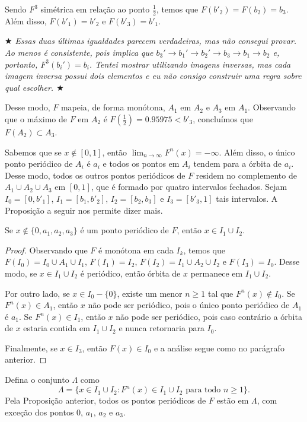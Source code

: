 Sendo $F^3$ simétrica em relação ao ponto $\frac{1}{2}$, temos que $F(b'_2) = F(b_2) = b_3$. Além disso, $F(b'_1) = b'_2$ e $F(b'_3) = b'_1$.

\textit{ $\bigstar$ Essas duas últimas igualdades parecem verdadeiras, mas não consegui provar. Ao menos é consistente, pois implica que $b_3' \to b_1' \to b_2' \to b_3 \to b_1 \to b_2$ e, portanto, $F^3(b_i') = b_i$. Tentei mostrar utilizando imagens inversas, mas cada imagem inversa possui dois elementos e eu não consigo construir uma regra sobre qual escolher. $\bigstar$}

Desse modo, $F$ mapeia, de forma monótona, $A_1$ em $A_2$ e $A_3$ em $A_1$. Observando que o máximo de $F$ em $A_2$ é $F \left( \frac{1}{2} \right) = 0.95975 < b'_3$, concluímos que $F(A_2) \subset A_3$.

Sabemos que se $x \notin [0, 1]$, então $\lim_{n \to \infty} F^n(x) = -\infty$. Além disso, o único ponto periódico de $A_i$ é $a_i$ e todos os pontos em $A_i$ tendem para a órbita de $a_i$. Desse modo, todos os outros pontos periódicos de $F$ residem no complemento de $A_1 \cup A_2 \cup A_3$ em $[0, 1]$, que é formado por quatro intervalos fechados. Sejam $I_0 = [0, b'_1]$, $I_1 = [b_1, b'_2]$, $I_2 = [b_2, b_3]$ e $I_3 = [b'_3, 1]$ tais intervalos. A Proposição a seguir nos permite dizer mais.

\begin{proposition}
Se $x \notin \{ 0, a_1, a_2, a_3 \}$ é um ponto periódico de $F$, então $x \in I_1 \cup I_2$.
\end{proposition}


\begin{proof}
Observando que $F$ é monótona em cada $I_k$, temos que $F(I_0) = I_0 \cup A_1 \cup I_1$, $F(I_1) = I_2$, $F(I_2) = I_1 \cup A_2 \cup I_2$ e $F(I_3) = I_0$. Desse modo, se $x \in I_1 \cup I_2$ é periódico, então órbita de $x$ permanece em $I_1 \cup I_2$.

Por outro lado, se $x \in I_0 - \{ 0 \}$, existe um menor $n \geq 1$ tal que $F^n(x) \notin I_0$. Se $F^n(x) \in A_1$, então $x$ não pode ser periódico, pois o único ponto periódico de $A_1$ é $a_1$. Se $F^n(x) \in I_1$, então $x$ não pode ser periódico, pois caso contrário a órbita de $x$ estaria contida em $I_1 \cup I_2$ e nunca retornaria para $I_0$.

Finalmente, se $x \in I_3$, então $F(x) \in I_0$ e a análise segue como no parágrafo anterior.
\end{proof}

Defina o conjunto $\Lambda$ como
$$\Lambda = \{ x \in I_1 \cup I_2 : F^n(x) \in I_1 \cup I_2 \textrm{ para todo } n \geq 1 \}.$$
Pela Proposição anterior, todos os pontos periódicos de $F$ estão em $\Lambda$, com exceção dos pontos $0$, $a_1$, $a_2$ e $a_3$.


